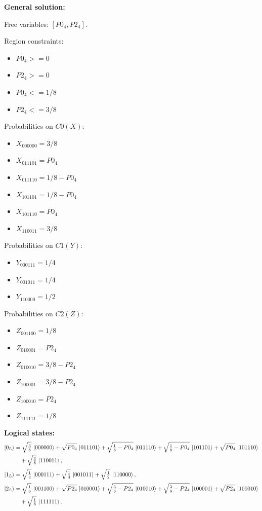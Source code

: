 \documentclass[11pt]{article}
\begin{document}
\noindent\textbf{General solution:}

Free variables: $[P0_4, P2_4]$.

Region constraints:
\begin{itemize}
    \item $P0_4 >= 0$
    \item $P2_4 >= 0$
    \item $P0_4 <= 1/8$
    \item $P2_4 <= 3/8$
\end{itemize}

Probabilities on $C0 (X)$:
\begin{itemize}
    \item $X_{000000} = 3/8$
    \item $X_{011101} = P0_4$
    \item $X_{011110} = 1/8 - P0_4$
    \item $X_{101101} = 1/8 - P0_4$
    \item $X_{101110} = P0_4$
    \item $X_{110011} = 3/8$
\end{itemize}

Probabilities on $C1 (Y)$:
\begin{itemize}
    \item $Y_{000111} = 1/4$
    \item $Y_{001011} = 1/4$
    \item $Y_{110000} = 1/2$
\end{itemize}

Probabilities on $C2 (Z)$:
\begin{itemize}
    \item $Z_{001100} = 1/8$
    \item $Z_{010001} = P2_4$
    \item $Z_{010010} = 3/8 - P2_4$
    \item $Z_{100001} = 3/8 - P2_4$
    \item $Z_{100010} = P2_4$
    \item $Z_{111111} = 1/8$
\end{itemize}

\noindent\textbf{Logical states:}
\begin{align*}
\ket{0_L} &= \sqrt{\tfrac{3}{8}}\,\ket{000000} + \sqrt{P0_4}\,\ket{011101} + \sqrt{\tfrac{1}{8} - P0_4}\,\ket{011110} + \sqrt{\tfrac{1}{8} - P0_4}\,\ket{101101} + \sqrt{P0_4}\,\ket{101110}\\
&\quad + \sqrt{\tfrac{3}{8}}\,\ket{110011},
\\[2pt]
\ket{1_L} &= \sqrt{\tfrac{1}{4}}\,\ket{000111} + \sqrt{\tfrac{1}{4}}\,\ket{001011} + \sqrt{\tfrac{1}{2}}\,\ket{110000},
\\[2pt]
\ket{2_L} &= \sqrt{\tfrac{1}{8}}\,\ket{001100} + \sqrt{P2_4}\,\ket{010001} + \sqrt{\tfrac{3}{8} - P2_4}\,\ket{010010} + \sqrt{\tfrac{3}{8} - P2_4}\,\ket{100001} + \sqrt{P2_4}\,\ket{100010}\\
&\quad + \sqrt{\tfrac{1}{8}}\,\ket{111111}.
\end{align*}
\end{document}
